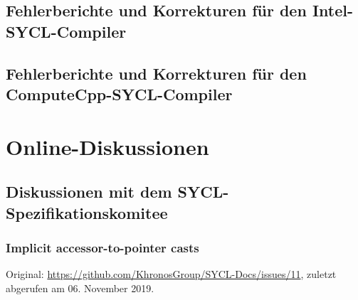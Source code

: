 \section{Fehlerberichte und Korrekturen für den Intel-SYCL-Compiler}
\label{anhang:fehler:intel}

\section{Fehlerberichte und Korrekturen für den ComputeCpp-SYCL-Compiler}
\label{anhang:fehler:computecpp}

\chapter{Online-Diskussionen}\label{anhang:diskussionen}

\section{Diskussionen mit dem SYCL-Spezifikationskomitee}
\label{anhang:diskussionen:syclspec}

\subsection{Implicit accessor-to-pointer casts}
\label{anhang:diskussion:syclspec:implicitaccessor}

Original: \url{https://github.com/KhronosGroup/SYCL-Docs/issues/11}, zuletzt
abgerufen am 06. November 2019.

